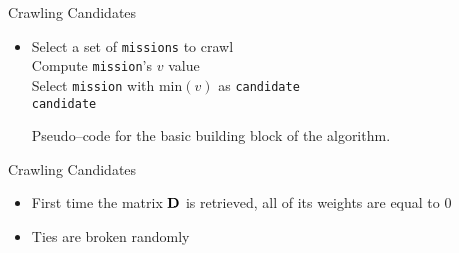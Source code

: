 \begin{frame}{Crawling Candidates}
    \begin{itemize}
        \item[\xspace]
        \begin{algorithm}[H]
            \SetAlgoLined
                \FMain{} {
                     {
                        Select a set of \texttt{missions} to crawl \\
                         {
                            Compute \texttt{mission}'s $v$ value \\
                        }
                        Select \texttt{mission} with $\text{min}(v)$ as \texttt{candidate} \\
                        \Return \texttt{candidate}
                    }
                }
            \caption{Pseudo--code for the basic building block \newline of the \mlblink algorithm.}
            \label{pscode:ml-blink}
        \end{algorithm}
    \end{itemize}
\end{frame}

\begin{frame}{Crawling Candidates}
    \begin{itemize}
        \item First time the matrix $\boldsymbol{\mathbf{D}}$ is retrieved, all of its weights are equal to $0$
        \item Ties are broken randomly
    \end{itemize}
\end{frame}
